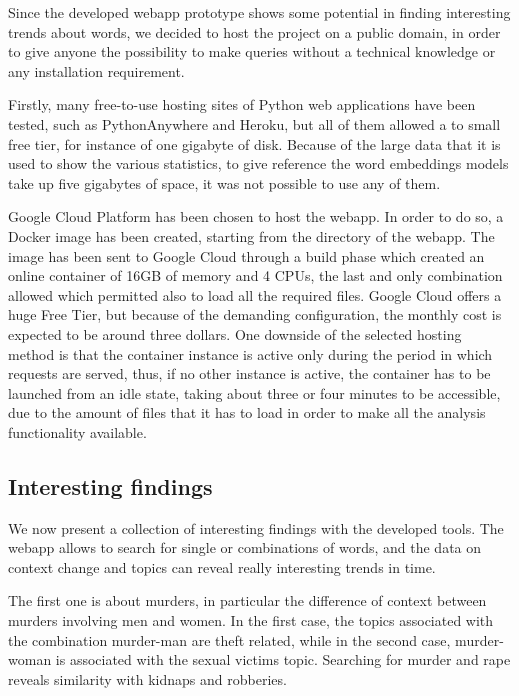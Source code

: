Since the developed webapp prototype shows some potential in finding interesting trends about words, we 
decided to host the project on a public domain, in order to give anyone the possibility to make queries 
without a technical knowledge or any installation requirement.

Firstly, many free-to-use hosting sites of Python web applications have been tested, such as PythonAnywhere and Heroku,
but all of them allowed a to small free tier, for instance of one gigabyte of disk. 
Because of the large data that it is used to
show the various statistics, to give reference the word embeddings models take up five gigabytes of space, it was not
possible to use any of them.

Google Cloud Platform has been chosen to host the webapp. In order to do so, a Docker image has been created, starting
from the directory of the webapp. The image has been sent to Google Cloud through a build phase which created an online
container of 16GB of memory and 4 CPUs, the last and only combination allowed which permitted also to load all the
required files. 
Google Cloud offers a huge Free Tier, but because of the demanding configuration,
the monthly cost is expected to be around three dollars. One downside of the selected hosting method is that the container instance is active only during the
period in which requests are served, thus, if no other instance is active, the container has to be launched
from an idle state, taking about three or four minutes to be accessible, due to the amount of files that it
has to load in order to make all the analysis functionality available.

\subsection{Interesting findings}
We now present a collection of interesting findings with the developed tools.
The webapp allows to search for single or combinations of words, and the data on context change and topics can 
reveal really interesting trends in time. 

The first one is about murders, in particular the difference of context between murders involving men and 
women. In the first case, the topics associated with the combination murder-man are theft related, while in the 
second case, murder-woman is associated with the sexual victims topic. Searching for murder and rape reveals 
similarity with kidnaps and robberies. 

